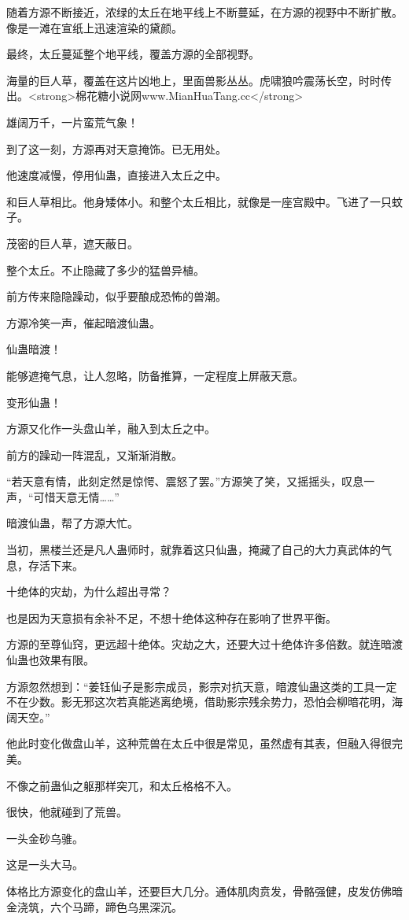 \begin{this_body}
随着方源不断接近，浓绿的太丘在地平线上不断蔓延，在方源的视野中不断扩散。像是一滩在宣纸上迅速渲染的黛颜。

最终，太丘蔓延整个地平线，覆盖方源的全部视野。

海量的巨人草，覆盖在这片凶地上，里面兽影丛丛。虎啸狼吟震荡长空，时时传出。<strong>棉花糖小说网www.MianHuaTang.cc</strong>

雄阔万千，一片蛮荒气象！

到了这一刻，方源再对天意掩饰。已无用处。

他速度减慢，停用仙蛊，直接进入太丘之中。

和巨人草相比。他身矮体小。和整个太丘相比，就像是一座宫殿中。飞进了一只蚊子。

茂密的巨人草，遮天蔽日。

整个太丘。不止隐藏了多少的猛兽异植。

前方传来隐隐躁动，似乎要酿成恐怖的兽潮。

方源冷笑一声，催起暗渡仙蛊。

仙蛊暗渡！

能够遮掩气息，让人忽略，防备推算，一定程度上屏蔽天意。

变形仙蛊！

方源又化作一头盘山羊，融入到太丘之中。

前方的躁动一阵混乱，又渐渐消散。

“若天意有情，此刻定然是惊愕、震怒了罢。”方源笑了笑，又摇摇头，叹息一声，“可惜天意无情……”

暗渡仙蛊，帮了方源大忙。

当初，黑楼兰还是凡人蛊师时，就靠着这只仙蛊，掩藏了自己的大力真武体的气息，存活下来。

十绝体的灾劫，为什么超出寻常？

也是因为天意损有余补不足，不想十绝体这种存在影响了世界平衡。

方源的至尊仙窍，更远超十绝体。灾劫之大，还要大过十绝体许多倍数。就连暗渡仙蛊也效果有限。

方源忽然想到：“姜钰仙子是影宗成员，影宗对抗天意，暗渡仙蛊这类的工具一定不在少数。影无邪这次若真能逃离绝境，借助影宗残余势力，恐怕会柳暗花明，海阔天空。”

他此时变化做盘山羊，这种荒兽在太丘中很是常见，虽然虚有其表，但融入得很完美。

不像之前蛊仙之躯那样突兀，和太丘格格不入。

很快，他就碰到了荒兽。

一头金砂乌骓。

这是一头大马。

体格比方源变化的盘山羊，还要巨大几分。通体肌肉贲发，骨骼强健，皮发仿佛暗金浇筑，六个马蹄，蹄色乌黑深沉。


\end{this_body}
